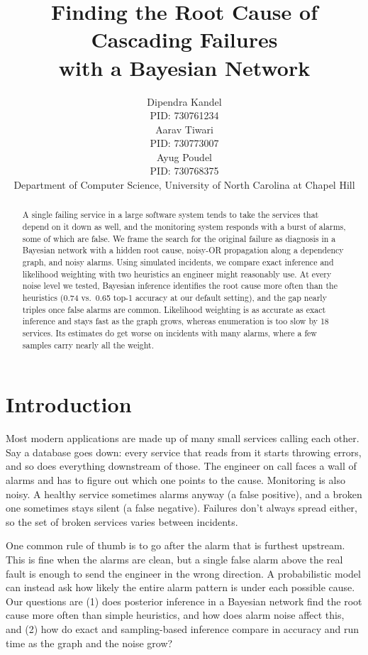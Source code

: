 \documentclass{article}
\title{Finding the Root Cause of Cascading Failures\\with a Bayesian Network}
\author{%
  Dipendra Kandel \\
  PID: 730761234 \\
  \And
  Aarav Tiwari \\
  PID: 730773007 \\
  \And
  Ayug Poudel \\
  PID: 730768375 \\
  \AND
  Department of Computer Science, University of North Carolina at Chapel Hill
}
\begin{document}
\maketitle

\begin{abstract}
A single failing service in a large software system tends to take the services
that depend on it down as well, and the monitoring system responds with a burst
of alarms, some of which are false. We frame the search for the original
failure as diagnosis in a Bayesian network with a hidden root cause, noisy-OR
propagation along a dependency graph, and noisy alarms. Using simulated
incidents, we compare exact inference and likelihood weighting with two
heuristics an engineer might reasonably use. At every noise level we tested,
Bayesian inference identifies the root cause more often than the heuristics
(0.74 vs.\ 0.65 top-1 accuracy at our default setting), and the gap nearly
triples once false alarms are common. Likelihood weighting is as accurate as
exact inference and stays fast as the graph grows, whereas enumeration is too
slow by 18 services. Its estimates do get worse on incidents with many alarms,
where a few samples carry nearly all the weight.
\end{abstract}

\section{Introduction}

Most modern applications are made up of many small services calling each
other. Say a database goes down: every service that reads from it starts
throwing errors, and so does everything downstream of those. The engineer on
call faces a wall of alarms and has to figure out which one points to the
cause. Monitoring is also noisy. A healthy service sometimes alarms anyway (a
false positive), and a broken one sometimes stays silent (a false negative).
Failures don't always spread either, so the set of broken services varies
between incidents.

One common rule of thumb is to go after the alarm that is furthest upstream.
This is fine when the alarms are clean, but a single false alarm above the real
fault is enough to send the engineer in the wrong direction. A probabilistic
model can instead ask how likely the entire alarm pattern is under each
possible cause. Our questions are (1) does posterior inference in a Bayesian
network find the root cause more often than simple heuristics, and how does
alarm noise affect this, and (2) how do exact and sampling-based inference
compare in accuracy and run time as the graph and the noise grow?
\end{document}
